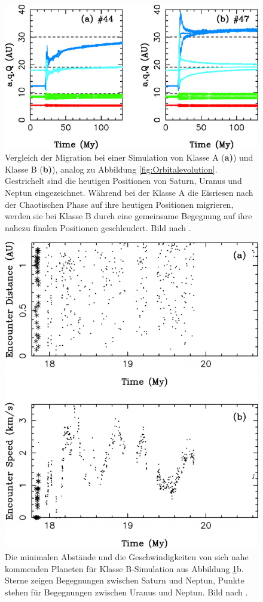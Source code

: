 \documentclass[12pt,a4paper,twoside]{article}
\begin{document}
\begin{figure}[tbn]
\centering
\includegraphics[scale=2]{img/Nesvorny2007-1.jpg}
\caption{Vergleich der Migration bei einer Simulation von Klasse A (\textbf{a)}) und Klasse B (\textbf{b)}), analog zu Abbildung \ref{fig:Orbitalevolution}. Gestrichelt sind die heutigen Positionen von Saturn, Uranus und Neptun eingezeichnet. Während bei der Klasse A die Eisriesen nach der Chaotischen Phase auf ihre heutigen Positionen migrieren, werden sie bei Klasse B durch eine gemeinsame Begegnung auf ihre nahezu finalen Positionen geschleudert. Bild nach \cite{Nesvorny2007}.}
\label{fig:Orbitalevolution_vergleich}
\end{figure}
\begin{figure}[tbn]
\centering
\includegraphics[scale=0.4]{img/Nesvorny2007-2.png}
\caption{Die minimalen Abstände und die Geschwindigkeiten von sich nahe kommenden Planeten für Klasse B-Simulation aus Abbildung \ref{fig:Orbitalevolution_vergleich}b. Sterne zeigen Begegnungen zwischen Saturn und Neptun, Punkte stehen für Begegnungen zwischen Uranus und Neptun. Bild nach \cite{Nesvorny2007}.}
\label{fig:Begegnungen}
\end{figure}
\end{document}
